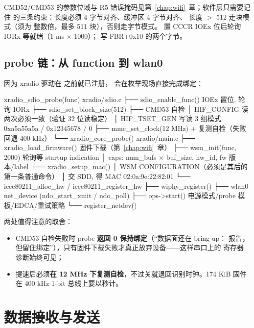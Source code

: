 CMD52/CMD53 的参数位域与 R5 错误掩码见第~\ref{chap:wifi}~章；软件层只需要记住
 的三条约束：长度必须 4 字节对齐、缓冲区 4 字节对齐、
长度 $>$ 512 走块模式（须为  整数倍，最多 511 块），否则走字节模式。
 置 CCCR IOEx 位后轮询 IORx 等就绪（1 ms × 1000）；
 写 FBR+0x10 的两个字节。

\subsection{probe 链：从 function 到 wlan0}

因为 xradio 驱动在  之前就已注册，
 会在枚举现场直接完成绑定：

\begin{txtcode}
xradio_sdio_probe(func)                          xradio/sdio.c
├── sdio_enable_func()               IOEx 置位, 轮询 IORx
├── sdio_set_block_size(512)
├── CMD53 自检
│     HIF_CONFIG 读两次必须一致（验证 32 位读稳定）
│     HIF_TSET_GEN 写读 3 组模式 0xa5a55a5a / 0x12345678 / 0
├── mmc_set_clock(12 MHz) + 复测自检（失败回退 400 kHz）
└── xradio_core_probe()                           xradio/main.c
    ├── xradio_load_firmware()       固件下载（第~\ref{chap:wifi}~章）
    ├── wsm_init(func, 2000)         轮询等 startup indication
    │     caps: num_bufs × buf_size, hw_id, fw 版本/label
    ├── xradio_setup_mac()
    │     WSM CONFIGURATION（必须是其后的第一条普通命令）
    │     交 SDD, 得 MAC 02:0a:9e:22:82:01
    └── ieee80211_alloc_hw / ieee80211_register_hw
        ├── wiphy_register()
        ├── wlan0 net_device (ndo_start_xmit / ndo_poll)
        ├── ops->start()             电源模式/probe 模板/EDCA/重试策略
        └── register_netdev()
\end{txtcode}

两处值得注意的取舍：

\begin{itemize}
  \item CMD53 自检失败时 probe \textbf{返回 0 保持绑定}（``数据面还在 bring-up：
        报告，但留住绑定''），只有固件下载失败才真正放弃设备——这样串口上的
        寄存器诊断始终可见；
  \item 提速后必须\textbf{在 12 MHz 下复测自检}，不过关就退回识别时钟。174 KiB
        固件在 400 kHz 1-bit 总线上要以秒计。
\end{itemize}

\section{数据接收与发送}

